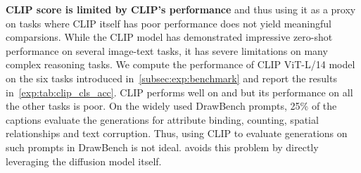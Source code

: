 \par \noindent \textbf{CLIP score is limited by CLIP's performance} and thus using it as a proxy on tasks where CLIP itself has poor performance does not yield meaningful comparsions.
While the CLIP model has demonstrated impressive zero-shot performance on several image-text tasks, it has severe limitations on many complex reasoning tasks.
We compute the performance of CLIP ViT-L/14 model on the six tasks introduced in~\cref{subsec:exp:benchmark} and report the results in~\cref{exp:tab:clip_cls_acc}.
CLIP performs well on  and  but its performance on all the other tasks is poor.
On the widely used DrawBench prompts, 25\% of the captions evaluate the generations for attribute binding, counting, spatial relationships and text corruption.
Thus, using CLIP to evaluate generations on such prompts in DrawBench is not ideal.
\OURS avoids this problem by directly leveraging the diffusion model itself.













        





